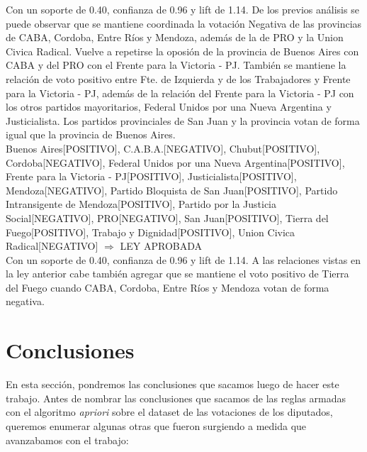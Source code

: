 \documentclass{endm}
\begin{document}
Con un soporte de 0.40, confianza de 0.96 y lift de 1.14. De los previos análisis se puede observar que se mantiene coordinada la votación Negativa de las provincias de CABA, Cordoba, Entre Ríos y Mendoza, además de la de PRO y la Union Civica Radical. Vuelve a repetirse la oposión de la provincia de Buenos Aires con CABA y del PRO con el Frente para la Victoria - PJ. También se mantiene la relación de voto positivo entre Fte. de Izquierda y de los Trabajadores y Frente para la Victoria - PJ, además de la relación del Frente para la Victoria - PJ con los otros partidos mayoritarios, Federal Unidos por una Nueva Argentina y Justicialista. Los partidos provinciales de San Juan y la provincia votan de forma igual que la provincia de Buenos Aires. \\

{Buenos Aires[POSITIVO],
C.A.B.A.[NEGATIVO], 
Chubut[POSITIVO], 
Cordoba[NEGATIVO], 
Federal Unidos por una Nueva Argentina[POSITIVO],
Frente para la Victoria - PJ[POSITIVO], 
Justicialista[POSITIVO],
Mendoza[NEGATIVO], 
Partido Bloquista de San Juan[POSITIVO],
Partido Intransigente de Mendoza[POSITIVO],
Partido por la Justicia Social[NEGATIVO],
PRO[NEGATIVO],              
San Juan[POSITIVO],  
Tierra del Fuego[POSITIVO], 
Trabajo y Dignidad[POSITIVO],  
Union Civica Radical[NEGATIVO]}     $\Longrightarrow$ {LEY APROBADA} \\

Con un soporte de 0.40, confianza de 0.96 y lift de 1.14. A las relaciones vistas en la ley anterior cabe también agregar que se mantiene el voto positivo de Tierra del Fuego cuando CABA, Cordoba, Entre Ríos y Mendoza votan de forma negativa. \\

\section{Conclusiones}
En esta sección, pondremos las conclusiones que sacamos luego de hacer este trabajo. Antes de nombrar las conclusiones que sacamos de las reglas armadas con el algoritmo \textit{apriori} sobre el dataset de las votaciones de los diputados, queremos enumerar algunas otras que fueron surgiendo a medida que avanzabamos con el trabajo:
\end{document}
